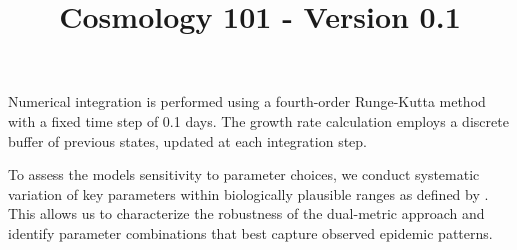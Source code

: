 \documentclass{article}\usepackage{graphicx} \usepackage{amsmath} \usepackage{colortbl}\title{Cosmology 101 - Version 0.1}
\begin{document}
Numerical integration is performed using a fourth-order Runge-Kutta method with a fixed time step of 0.1 days. The growth rate calculation employs a discrete buffer of previous states, updated at each integration step.

To assess the models sensitivity to parameter choices, we conduct systematic variation of key parameters within biologically plausible ranges as defined by \citet{verelst2016behavioural}. This allows us to characterize the robustness of the dual-metric approach and identify parameter combinations that best capture observed epidemic patterns.
\end{document}
